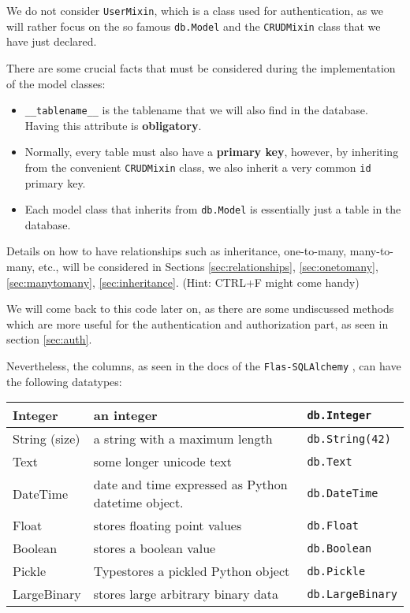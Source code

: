 \documentclass[../main/main.tex]{subfiles}
\begin{document}
We do not consider \lstinline|UserMixin|, which is a class used for
authentication, as we will rather focus on the so famous
\lstinline|db.Model| and the \lstinline|CRUDMixin| class that we have
just declared.

There are some crucial facts that must be considered during the
implementation of the model classes:

\begin{itemize}
  \item \lstinline|__tablename__| is the tablename that we will also
    find in the database. Having this attribute is
    \textbf{obligatory}. 
  \item Normally, every table must also have a \textbf{primary key}, however,
    by inheriting from the convenient \lstinline|CRUDMixin| class, we
    also inherit a very common \lstinline|id| primary key. 
  \item Each model class that inherits from \lstinline|db.Model|
    is essentially just a table in the database. 
\end{itemize}

Details on how to have relationships such as inheritance, one-to-many,
many-to-many, etc., will be considered in Sections
\ref{sec:relationships}, \ref{sec:onetomany}, \ref{sec:manytomany},
\ref{sec:inheritance}. (Hint: CTRL+F might come handy) 

We will come back to this code later on, as there are some undiscussed
methods which are more useful for the authentication and authorization
part, as seen in section \ref{sec:auth}.

Nevertheless, the columns, as seen in the docs of the
\lstinline|Flas-SQLAlchemy| \cite{mitsuhiko:declare_models}, can have
the following datatypes: 

\begin{tabular}{ | l | l | l | } \\ \hline
Integer & an integer & \lstinline|db.Integer| \\ \hline
String (size) & a string with a maximum length &  \lstinline|db.String(42)|\\ \hline
Text & some longer unicode text &  \lstinline|db.Text|  \\ \hline
DateTime & date and time expressed as Python datetime object. & \lstinline|db.DateTime|\\ \hline
Float & stores floating point values & \lstinline|db.Float| \\ \hline
Boolean & stores a boolean value & \lstinline|db.Boolean| \\ \hline
Pickle & Typestores a pickled Python object &  \lstinline|db.Pickle| \\ \hline
LargeBinary & stores large arbitrary binary data &  \lstinline|db.LargeBinary|\\ \hline
\end{tabular}
\end{document}

